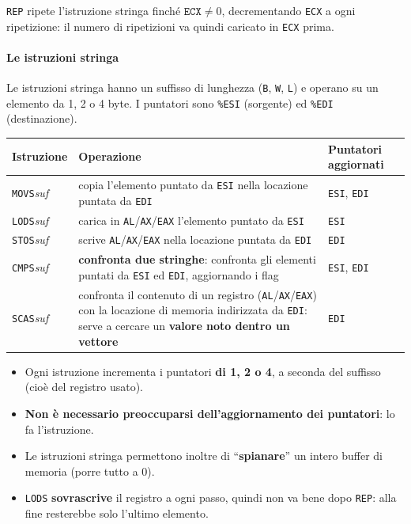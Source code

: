\documentclass[11pt,a4paper]{article}
\newcommand{\reg}[1]{\texttt{\%#1}}
\begin{document}
\begin{integrazione}
\texttt{REP} ripete l'istruzione stringa finché $\texttt{ECX}\neq 0$, decrementando \texttt{ECX} a ogni ripetizione: il numero di ripetizioni va quindi caricato in \texttt{ECX} prima.
\end{integrazione}

\paragraph*{Le istruzioni stringa}

Le istruzioni stringa hanno un suffisso di lunghezza (\texttt{B}, \texttt{W}, \texttt{L}) e operano su un elemento da 1, 2 o 4 byte. I puntatori sono \reg{ESI} (sorgente) ed \reg{EDI} (destinazione).

\begin{center}
\begin{tabular}{l p{8.5cm} l}
\textbf{Istruzione} & \textbf{Operazione} & \textbf{Puntatori aggiornati} \\ \hline
\texttt{MOVS}\emph{suf} & copia l'elemento puntato da \texttt{ESI} nella locazione puntata da \texttt{EDI} & \texttt{ESI}, \texttt{EDI} \\
\texttt{LODS}\emph{suf} & carica in \texttt{AL}/\texttt{AX}/\texttt{EAX} l'elemento puntato da \texttt{ESI} & \texttt{ESI} \\
\texttt{STOS}\emph{suf} & scrive \texttt{AL}/\texttt{AX}/\texttt{EAX} nella locazione puntata da \texttt{EDI} & \texttt{EDI} \\
\texttt{CMPS}\emph{suf} & \textbf{confronta due stringhe}: confronta gli elementi puntati da \texttt{ESI} ed \texttt{EDI}, aggiornando i flag & \texttt{ESI}, \texttt{EDI} \\
\texttt{SCAS}\emph{suf} & confronta il contenuto di un registro (\texttt{AL}/\texttt{AX}/\texttt{EAX}) con la locazione di memoria indirizzata da \texttt{EDI}: serve a cercare un \textbf{valore noto dentro un vettore} & \texttt{EDI} \\
\end{tabular}
\end{center}

\begin{itemize}[leftmargin=*]
  \item Ogni istruzione incrementa i puntatori \textbf{di 1, 2 o 4}, a seconda del suffisso (cioè del registro usato).
  \item \textbf{Non è necessario preoccuparsi dell'aggiornamento dei puntatori}: lo fa l'istruzione.
  \item Le istruzioni stringa permettono inoltre di ``\textbf{spianare}'' un intero buffer di memoria (porre tutto a 0).
  \item \texttt{LODS} \textbf{sovrascrive} il registro a ogni passo, quindi non va bene dopo \texttt{REP}: alla fine resterebbe solo l'ultimo elemento.
\end{itemize}
\end{document}
